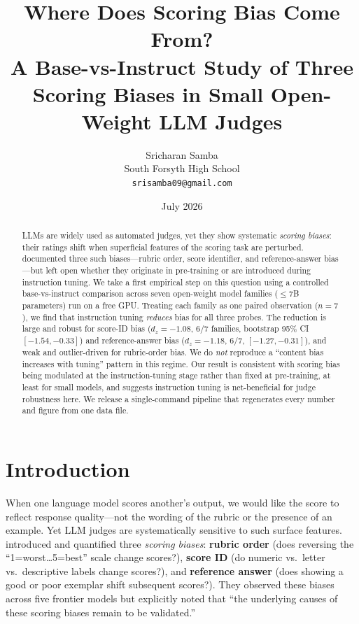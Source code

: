 \documentclass[11pt]{article}
\title{\textbf{Where Does Scoring Bias Come From?}\\
\large A Base-vs-Instruct Study of Three Scoring Biases in Small Open-Weight LLM Judges}
\author{Sricharan Samba\\
\small South Forsyth High School \\
\small \texttt{srisamba09@gmail.com}}
\date{July 2026}
\begin{document}
\maketitle

\begin{abstract}
\noindent
LLMs are widely used as automated judges, yet they show systematic \emph{scoring
biases}: their ratings shift when superficial features of the scoring task are
perturbed. \citet{li2025scoring} documented three such biases---rubric order,
score identifier, and reference-answer bias---but left open whether they
originate in pre-training or are introduced during instruction tuning. We take a
first empirical step on this question using a controlled base-vs-instruct
comparison across seven open-weight model families ($\leq$7B parameters) run on a
free GPU. Treating each family as one paired observation ($n=7$), we find that
instruction tuning \emph{reduces} bias for all three probes. The reduction is
large and robust for score-ID bias ($d_z=-1.08$, 6/7 families, bootstrap
95\% CI $[-1.54,-0.33]$) and reference-answer bias ($d_z=-1.18$, 6/7,
$[-1.27,-0.31]$), and weak and outlier-driven for rubric-order bias. We do
\emph{not} reproduce a ``content bias increases with tuning'' pattern in this
regime. Our result is consistent with scoring bias being modulated at the
instruction-tuning stage rather than fixed at pre-training, at least for small
models, and suggests instruction tuning is net-beneficial for judge robustness
here. We release a single-command pipeline that regenerates every number and
figure from one data file.
\end{abstract}

\section{Introduction}
When one language model scores another's output, we would like the score to
reflect response quality---not the wording of the rubric or the presence of an
example. Yet LLM judges are systematically sensitive to such surface features.
\citet{li2025scoring} introduced and quantified three \emph{scoring biases}:
\textbf{rubric order} (does reversing the ``1=worst\dots5=best'' scale change
scores?), \textbf{score ID} (do numeric vs.\ letter vs.\ descriptive labels
change scores?), and \textbf{reference answer} (does showing a good or poor
exemplar shift subsequent scores?). They observed these biases across five
frontier models but explicitly noted that ``the underlying causes of these
scoring biases remain to be validated.''
\end{document}
